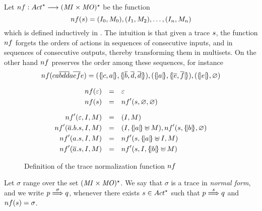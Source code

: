 

Let $\chopSym : \Actfin \longrightarrow ( \MI \times \MO )^\star$ %
be the function %
$$
\chop{ \trace } = (\I_0, M_0),( \I_1, M_2), \ldots , (\I_n,M_n)
$$
which is defined inductively in .  The
intuition is that given a trace $s$, the function $\chopSym$
forgets the orders of actions in sequences of consecutive inputs, and
in sequences of consecutive outputs, thereby transforming them in
multisets. On the other hand $\chopSym$ preserves the order
among these sequences, for instance
$$
\chop{ c\aa\co{bdd}\aa\co{ef}e} =
(\mset{c, \aa}, \mset{\co{\ab},\co{d},\co{d}}),
(\mset{\aa}, \mset{\co{e},\co{f}}),
(\mset{e},\varnothing)
$$

\begin{figure}[t]
  \hrulefill
$$
\begin{array}{rcl}
  \chopSym(\varepsilon) & = & \varepsilon \\[3pt]
  \chopSym(s) & = & \chopSym'(s, \varnothing, \varnothing) \\[10pt]

  \chopSym'(\varepsilon, I, M) & = & (I,M) \\[3pt]
  \chopSym'(\co{\aa}.b.s, I, M) & = & (I, \mset{\aa} \uplus M), \chopSym'(s, \mset{b}, \varnothing)\\[3pt]
  \chopSym'(\aa.s, I, M) & = & \chopSym'(s, \mset{\aa} \uplus I, M)\\[3pt]
  \chopSym'(\co{\aa}.s, I, M) & = & \chopSym'(s, I, \mset{b} \uplus M)

\end{array}
$$

  \caption{Definition of the trace normalization function $\chopSym$}
  \label{fig:nf-trace-def}
  \hrulefill
\end{figure}

Let $\sigma$ range over the set $( \mathit{MI} \times \mathit{MO} )^\star$. We
say that $\sigma$ is a trace in {\em normal form}, and we write
$ p \mathrel{\overset{ \sigma } \Longrightarrow} q$, whenever there exists $\trace \in \Actfin$
such that $ p \mathrel{\overset{ s } \Longrightarrow} q$ and $\chop{\trace} = \sigma $.






